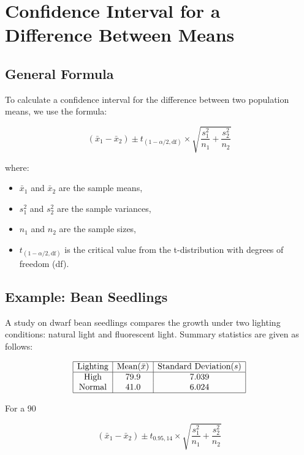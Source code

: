 \documentclass{article}
\begin{document}
\section{Confidence Interval for a Difference Between Means}

\subsection{General Formula}

To calculate a confidence interval for the difference between two population means, we use the formula:

\[
(\bar{x}_1 - \bar{x}_2) \pm t_{(1-\alpha/2, \text{df})} \times \sqrt{\frac{s_1^2}{n_1} + \frac{s_2^2}{n_2}}
\]

where:
\begin{itemize}
    \item \( \bar{x}_1 \) and \( \bar{x}_2 \) are the sample means,
    \item \( s_1^2 \) and \( s_2^2 \) are the sample variances,
    \item \( n_1 \) and \( n_2 \) are the sample sizes,
    \item \( t_{(1-\alpha/2, \text{df})} \) is the critical value from the t-distribution with degrees of freedom (df).
\end{itemize}

\subsection{Example: Bean Seedlings}

A study on dwarf bean seedlings compares the growth under two lighting conditions: natural light and fluorescent light. Summary statistics are given as follows:

\[
\begin{array}{|c|c|c|}
\hline
\text{Lighting} & \text{Mean} (\bar{x}) & \text{Standard Deviation} (s) \\
\hline
\text{High} & 79.9 & 7.039 \\
\text{Normal} & 41.0 & 6.024 \\
\hline
\end{array}
\]

For a 90%

\[
(\bar{x}_1 - \bar{x}_2) \pm t_{0.95, 14} \times \sqrt{\frac{s_1^2}{n_1} + \frac{s_2^2}{n_2}}
\]
\end{document}
